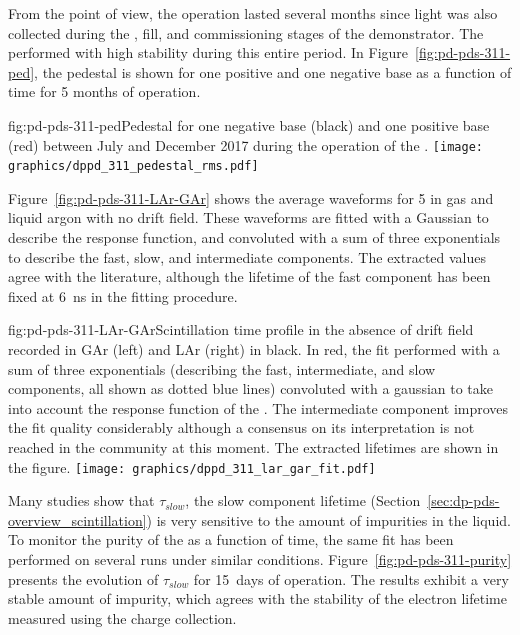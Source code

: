From the  point of view, the  operation lasted several months since light was also collected during the \cooldown, fill, and commissioning stages of the demonstrator.
The  performed with high stability during this entire period. 
In Figure~\ref{fig:pd-pds-311-ped}, the  pedestal  is shown for one positive and one negative base  as a function of time for \num{5} months of operation. 

\begin{dunefigure}{fig:pd-pds-311-ped}{Pedestal  for one negative base  (black) and one positive base  (red) between July and December 2017 during the operation of the .}
\texttt{[image: graphics/dppd\_311\_pedestal\_rms.pdf]}
\end{dunefigure}

Figure~\ref{fig:pd-pds-311-LAr-GAr} shows the average waveforms for  5 in gas and liquid argon with no drift field. These waveforms are fitted with a Gaussian to describe the response function, and convoluted with a sum of three exponentials to describe the fast, slow, and intermediate components. 
The extracted values agree with the literature, although the lifetime of the fast component has been fixed at \SI{6}{ns} in the fitting procedure.

\begin{dunefigure}{fig:pd-pds-311-LAr-GAr}{Scintillation time profile in the absence of drift field recorded in GAr (left) and LAr (right) in black. In red, the fit performed with a sum of three exponentials (describing the fast, intermediate, and slow components, all shown as dotted blue lines) convoluted with a gaussian to take into account the response function of the . The intermediate component improves the fit quality considerably although a consensus on its interpretation is not reached in the community at this moment. The extracted lifetimes are shown in the figure.}
\texttt{[image: graphics/dppd\_311\_lar\_gar\_fit.pdf]}
\end{dunefigure}

Many studies show that $\tau_{slow}$, the slow component lifetime (Section~\ref{sec:dp-pds-overview_scintillation}) is very sensitive to the amount of impurities in the liquid.
To monitor the purity of the  as a function of time, the same fit has been performed on several runs under similar conditions. 
Figure~\ref{fig:pd-pds-311-purity} presents the evolution of $\tau_{slow}$ for \SI{15}{days} of operation.
The results exhibit a very stable amount of impurity, which agrees with the stability of the electron lifetime measured using the charge collection.

